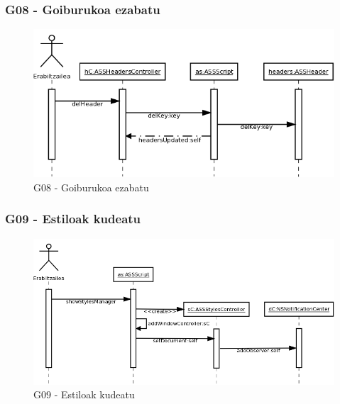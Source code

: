 \subsubsection{G08 - Goiburukoa ezabatu}
\begin{figure}[htp]
\begin{center}
\includegraphics[scale=0.4]{Pictures/Chapter4/Diseinua/G08.png}
\caption{G08 - Goiburukoa ezabatu}
\label{g08d}
\end{center}
\end{figure}

\newpage
\subsubsection{G09 - Estiloak kudeatu}
\begin{figure}[htp]
\begin{center}
\includegraphics[scale=0.35]{Pictures/Chapter4/Diseinua/G09.png}
\caption{G09 - Estiloak kudeatu}
\label{g09d}
\end{center}
\end{figure}

